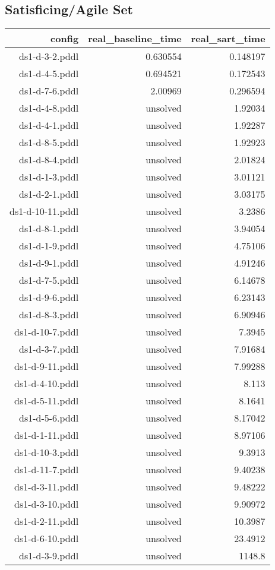 \documentclass{article}
\begin{document}
                    
                    \subsection*{Satisficing/Agile Set}
                    
                            \begin{center}
                            \scriptsize
                            \begin{tabular}{r|r|r}
                            config & real\_baseline\_time & real\_sart\_time\\\midrule
                             ds1-d-3-2.pddl&0.630554&0.148197\\
 ds1-d-4-5.pddl&0.694521&0.172543\\
 ds1-d-7-6.pddl&2.00969&0.296594\\
 ds1-d-4-8.pddl&unsolved&1.92034\\
 ds1-d-4-1.pddl&unsolved&1.92287\\
 ds1-d-8-5.pddl&unsolved&1.92923\\
 ds1-d-8-4.pddl&unsolved&2.01824\\
 ds1-d-1-3.pddl&unsolved&3.01121\\
 ds1-d-2-1.pddl&unsolved&3.03175\\
 ds1-d-10-11.pddl&unsolved&3.2386\\
 ds1-d-8-1.pddl&unsolved&3.94054\\
 ds1-d-1-9.pddl&unsolved&4.75106\\
 ds1-d-9-1.pddl&unsolved&4.91246\\
 ds1-d-7-5.pddl&unsolved&6.14678\\
 ds1-d-9-6.pddl&unsolved&6.23143\\
 ds1-d-8-3.pddl&unsolved&6.90946\\
 ds1-d-10-7.pddl&unsolved&7.3945\\
 ds1-d-3-7.pddl&unsolved&7.91684\\
 ds1-d-9-11.pddl&unsolved&7.99288\\
 ds1-d-4-10.pddl&unsolved&8.113\\
 ds1-d-5-11.pddl&unsolved&8.1641\\
 ds1-d-5-6.pddl&unsolved&8.17042\\
 ds1-d-1-11.pddl&unsolved&8.97106\\
 ds1-d-10-3.pddl&unsolved&9.3913\\
 ds1-d-11-7.pddl&unsolved&9.40238\\
 ds1-d-3-11.pddl&unsolved&9.48222\\
 ds1-d-3-10.pddl&unsolved&9.90972\\
 ds1-d-2-11.pddl&unsolved&10.3987\\
 ds1-d-6-10.pddl&unsolved&23.4912\\
 ds1-d-3-9.pddl&unsolved&1148.8
                            \end{tabular}
                            \end{center}
                    
\end{document}
